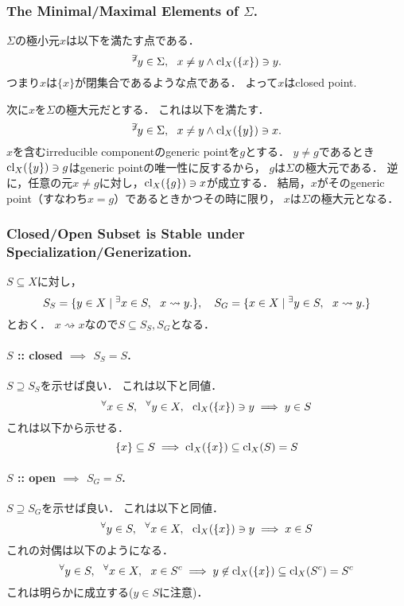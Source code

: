\documentclass[a4paper]{jsarticle}
\begin{document}
    \subsubsection{The Minimal/Maximal Elements of $\Sigma$.}
    $\Sigma$の極小元$x$は以下を満たす点である．
    \[ {}^{\not \exists} y \in \Sigma,~~ x \neq y \land \operatorname{cl}_X(\{x\}) \ni y. \]
    つまり$x$は$\{x\}$が閉集合であるような点である．
    よって$x$はclosed point.

    次に$x$を$\Sigma$の極大元だとする．
    これは以下を満たす．
    \[ {}^{\not \exists} y \in \Sigma,~~ x \neq y \land \operatorname{cl}_X(\{y\}) \ni x. \]
    $x$を含むirreducible componentのgeneric pointを$g$とする．
    $y \neq g$であるとき$\operatorname{cl}_X(\{y\}) \ni g$はgeneric pointの唯一性に反するから，
    $g$は$\Sigma$の極大元である．
    逆に，任意の元$x \neq g$に対し，$\operatorname{cl}_X(\{g\}) \ni x$が成立する．
    結局，$x$がそのgeneric point（すなわち$x=g$）であるときかつその時に限り，
    $x$は$\Sigma$の極大元となる．

    \subsubsection{Closed/Open Subset is Stable under Specialization/Generization.}
    $S \subseteq X$に対し，
    \[
        S_S=\{ y \in X \mid {}^{\exists} x \in S,~~ x \rightsquigarrow y. \},~~~
        S_G=\{ x \in X \mid {}^{\exists} y \in S,~~ x \rightsquigarrow y. \}
    \]
    とおく．
    $x \rightsquigarrow x$なので$S \subseteq S_S, S_G$となる．
    
    \paragraph{$S$ :: closed $\implies$ $S_S=S$.}
    $S \supseteq S_S$を示せば良い．
    これは以下と同値．
    \[
        {}^{\forall} x \in S,~~ {}^{\forall} y \in X,~~ 
        \operatorname{cl}_X(\{x\}) \ni y \implies y \in S
    \]
    これは以下から示せる．
    \[ \{x\} \subseteq S \implies \operatorname{cl}_X(\{x\}) \subseteq \operatorname{cl}_X(S)=S \]

    \paragraph{$S$ :: open $\implies$ $S_G=S$.}
    $S \supseteq S_G$を示せば良い．
    これは以下と同値．
    \[
        {}^{\forall} y \in S,~~ {}^{\forall} x \in X,~~ 
        \operatorname{cl}_X(\{x\}) \ni y \implies x \in S
    \]
    これの対偶は以下のようになる．
    \[
        {}^{\forall} y \in S,~~ {}^{\forall} x \in X,~~ 
        x \in S^c \implies y \not \in \operatorname{cl}_X(\{x\}) \subseteq \operatorname{cl}_X(S^c)=S^c
    \]
    これは明らかに成立する($y \in S$に注意)．
\end{document}
